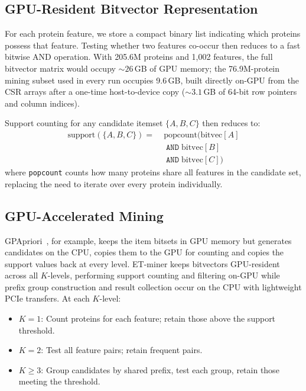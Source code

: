 \documentclass[10pt,a4paper,twocolumn]{article}
\begin{document}
\subsection{GPU-Resident Bitvector Representation}
\label{sec:bitvec}

For each protein feature, we store a compact binary list indicating which proteins possess that feature. Testing whether two features co-occur then reduces to a fast bitwise AND operation. With 205.6M proteins and 1,002 features, the full bitvector matrix would occupy ${\sim}26$\,GB of GPU memory; the 76.9M-protein mining subset used in every run occupies 9.6\,GB, built directly on-GPU from the CSR arrays after a one-time host-to-device copy (${\sim}3.1$\,GB of 64-bit row pointers and column indices).

Support counting for any candidate itemset $\{A, B, C\}$ then reduces to:
\begin{align*}
    \text{support}(\{A, B, C\}) = \;&\text{popcount}(\text{bitvec}[A] \\
    &\;\texttt{AND}\; \text{bitvec}[B] \\
    &\;\texttt{AND}\; \text{bitvec}[C])
\end{align*}
where \texttt{popcount} counts how many proteins share all features in the candidate set, replacing the need to iterate over every protein individually.

\subsection{GPU-Accelerated Mining}

GPApriori~\cite{zhang2011}, for example, keeps the item bitsets in GPU memory but generates candidates on the CPU, copies them to the GPU for counting and copies the support values back at every level. ET-miner keeps bitvectors GPU-resident across all $K$-levels, performing support counting and filtering on-GPU while prefix group construction and result collection occur on the CPU with lightweight PCIe transfers. At each $K$-level:

\begin{itemize}[leftmargin=*]
    \item $K{=}1$: Count proteins for each feature; retain those above the
          support threshold.
    \item $K{=}2$: Test all feature pairs; retain frequent pairs.
    \item $K{\geq}3$: Group candidates by shared prefix, test each group,
          retain those meeting the threshold.
\end{itemize}
\end{document}
